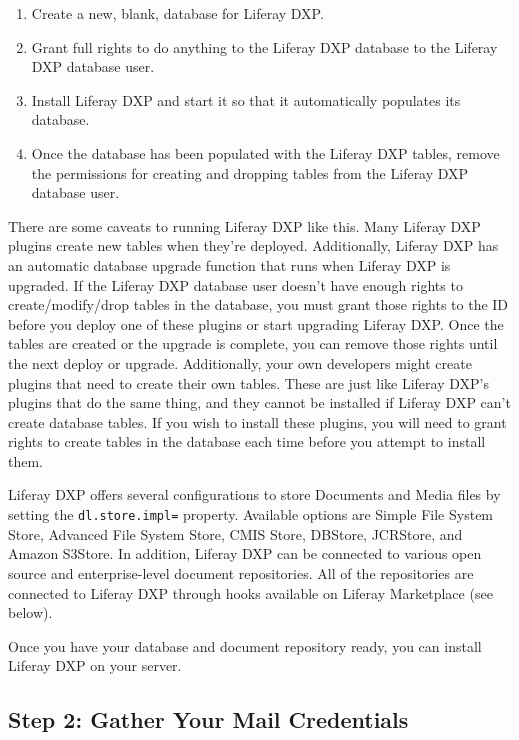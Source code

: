 \begin{enumerate}
\def\labelenumi{\arabic{enumi}.}
\item
  Create a new, blank, database for Liferay DXP.
\item
  Grant full rights to do anything to the Liferay DXP database to the
  Liferay DXP database user.
\item
  Install Liferay DXP and start it so that it automatically populates
  its database.
\item
  Once the database has been populated with the Liferay DXP tables,
  remove the permissions for creating and dropping tables from the
  Liferay DXP database user.
\end{enumerate}

There are some caveats to running Liferay DXP like this. Many Liferay
DXP plugins create new tables when they're deployed. Additionally,
Liferay DXP has an automatic database upgrade function that runs when
Liferay DXP is upgraded. If the Liferay DXP database user doesn't have
enough rights to create/modify/drop tables in the database, you must
grant those rights to the ID before you deploy one of these plugins or
start upgrading Liferay DXP. Once the tables are created or the upgrade
is complete, you can remove those rights until the next deploy or
upgrade. Additionally, your own developers might create plugins that
need to create their own tables. These are just like Liferay DXP's
plugins that do the same thing, and they cannot be installed if Liferay
DXP can't create database tables. If you wish to install these plugins,
you will need to grant rights to create tables in the database each time
before you attempt to install them.

Liferay DXP offers several configurations to store Documents and Media
files by setting the \texttt{dl.store.impl=} property. Available options
are Simple File System Store, Advanced File System Store, CMIS Store,
DBStore, JCRStore, and Amazon S3Store. In addition, Liferay DXP can be
connected to various open source and enterprise-level document
repositories. All of the repositories are connected to Liferay DXP
through hooks available on Liferay Marketplace (see below).

Once you have your database and document repository ready, you can
install Liferay DXP on your server.

\subsection{Step 2: Gather Your Mail
Credentials}\label{step-2-gather-your-mail-credentials}

